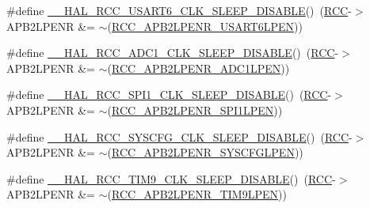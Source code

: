 \begin{DoxyCompactItemize}
\item 
\#define \hyperlink{group___r_c_c___a_p_b2___low_power___enable___disable_ga7df7a1b0a2e5d8b9318cf68de7665b3b}{\+\_\+\+\_\+\+H\+A\+L\+\_\+\+R\+C\+C\+\_\+\+U\+S\+A\+R\+T6\+\_\+\+C\+L\+K\+\_\+\+S\+L\+E\+E\+P\+\_\+\+D\+I\+S\+A\+B\+LE}()~(\hyperlink{group___peripheral__declaration_ga74944438a086975793d26ae48d5882d4}{R\+CC}-\/$>$A\+P\+B2\+L\+P\+E\+NR \&= $\sim$(\hyperlink{group___peripheral___registers___bits___definition_ga2b82eb1986da9ed32e6701d01fffe55d}{R\+C\+C\+\_\+\+A\+P\+B2\+L\+P\+E\+N\+R\+\_\+\+U\+S\+A\+R\+T6\+L\+P\+EN}))
\item 
\#define \hyperlink{group___r_c_c___a_p_b2___low_power___enable___disable_ga9534ddc24145ef6335d76b35632b7fe2}{\+\_\+\+\_\+\+H\+A\+L\+\_\+\+R\+C\+C\+\_\+\+A\+D\+C1\+\_\+\+C\+L\+K\+\_\+\+S\+L\+E\+E\+P\+\_\+\+D\+I\+S\+A\+B\+LE}()~(\hyperlink{group___peripheral__declaration_ga74944438a086975793d26ae48d5882d4}{R\+CC}-\/$>$A\+P\+B2\+L\+P\+E\+NR \&= $\sim$(\hyperlink{group___peripheral___registers___bits___definition_ga126a8791f77cecc599e32d2c882a4dab}{R\+C\+C\+\_\+\+A\+P\+B2\+L\+P\+E\+N\+R\+\_\+\+A\+D\+C1\+L\+P\+EN}))
\item 
\#define \hyperlink{group___r_c_c___a_p_b2___low_power___enable___disable_ga2abe90eeb15890f45e28e8926bf70838}{\+\_\+\+\_\+\+H\+A\+L\+\_\+\+R\+C\+C\+\_\+\+S\+P\+I1\+\_\+\+C\+L\+K\+\_\+\+S\+L\+E\+E\+P\+\_\+\+D\+I\+S\+A\+B\+LE}()~(\hyperlink{group___peripheral__declaration_ga74944438a086975793d26ae48d5882d4}{R\+CC}-\/$>$A\+P\+B2\+L\+P\+E\+NR \&= $\sim$(\hyperlink{group___peripheral___registers___bits___definition_ga2c6729058e54f4b8f8ae01d5b3586aaa}{R\+C\+C\+\_\+\+A\+P\+B2\+L\+P\+E\+N\+R\+\_\+\+S\+P\+I1\+L\+P\+EN}))
\item 
\#define \hyperlink{group___r_c_c___a_p_b2___low_power___enable___disable_ga04863ff5c2174552387c549f0410df43}{\+\_\+\+\_\+\+H\+A\+L\+\_\+\+R\+C\+C\+\_\+\+S\+Y\+S\+C\+F\+G\+\_\+\+C\+L\+K\+\_\+\+S\+L\+E\+E\+P\+\_\+\+D\+I\+S\+A\+B\+LE}()~(\hyperlink{group___peripheral__declaration_ga74944438a086975793d26ae48d5882d4}{R\+CC}-\/$>$A\+P\+B2\+L\+P\+E\+NR \&= $\sim$(\hyperlink{group___peripheral___registers___bits___definition_gaaa82cfc33f0cf71220398bbe1c4b412e}{R\+C\+C\+\_\+\+A\+P\+B2\+L\+P\+E\+N\+R\+\_\+\+S\+Y\+S\+C\+F\+G\+L\+P\+EN}))
\item 
\#define \hyperlink{group___r_c_c___a_p_b2___low_power___enable___disable_ga531cefe824de1fa7461b34030d30d75f}{\+\_\+\+\_\+\+H\+A\+L\+\_\+\+R\+C\+C\+\_\+\+T\+I\+M9\+\_\+\+C\+L\+K\+\_\+\+S\+L\+E\+E\+P\+\_\+\+D\+I\+S\+A\+B\+LE}()~(\hyperlink{group___peripheral__declaration_ga74944438a086975793d26ae48d5882d4}{R\+CC}-\/$>$A\+P\+B2\+L\+P\+E\+NR \&= $\sim$(\hyperlink{group___peripheral___registers___bits___definition_ga91b882f3dc2b939a53ed3f4caa537de1}{R\+C\+C\+\_\+\+A\+P\+B2\+L\+P\+E\+N\+R\+\_\+\+T\+I\+M9\+L\+P\+EN}))

\end{DoxyCompactItemize}
